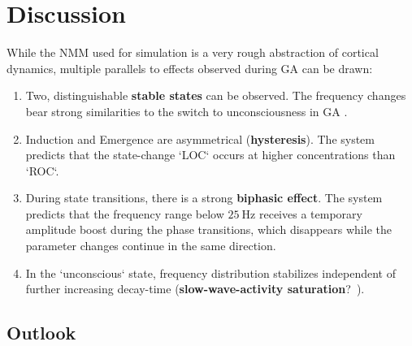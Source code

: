 \chapter{Discussion}

While the NMM used for simulation is a very rough abstraction of cortical dynamics,
multiple parallels to effects observed during GA can be drawn:

\begin{enumerate}

    \item Two, distinguishable \textbf{stable states} can be observed.
    The frequency changes bear strong similarities to the switch to unconsciousness in GA
    \cite{purdon_electroencephalogram_2013, ni_mhuircheartaigh_slow_wave_2013}.
    \item Induction and Emergence are asymmetrical (\textbf{hysteresis}).
    The system predicts that the state-change `LOC` occurs at higher concentrations than `ROC`.

    \item During state transitions, there is a strong \textbf{biphasic effect}.
    The system predicts that the frequency range below $\SI{25}{\hertz}$ receives a temporary amplitude boost during
    the phase transitions, which disappears while the parameter changes continue in the same direction.
    \item In the `unconscious` state, frequency distribution stabilizes independent of further increasing decay-time
    (\textbf{slow-wave-activity saturation}?~\cite{ni_mhuircheartaigh_slow_wave_2013}).

\end{enumerate}


\section{Outlook}
